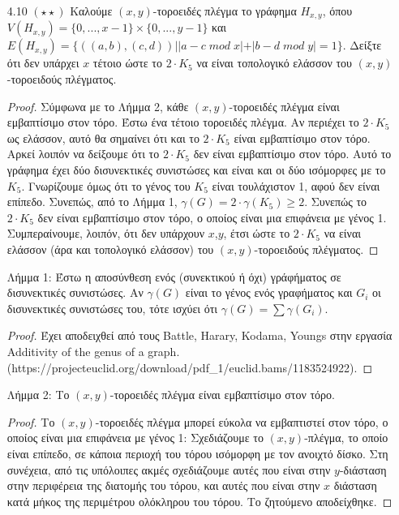 \documentclass[a4paper, oneside, 11pt]{article}
\theoremstyle{definition}
\begin{document}
\begin{enumerate}
\begin{proof}
Συμπεραίνουμε ότι, αφού κάθε άλλη περίπτωση κατέληξε στη μη επιπεδότητα του $G^2$, ότι το $G$ είναι το $K_4$ χωρίς μία ακμή.
	\end{proof}

\item[4.10 $(\star \star)$]
Καλούμε $(x,y)$-τοροειδές πλέγμα το γράφημα $H_{x,y}$, όπου $V(H_{x,y})=\{0,...,x-1\}\times \{0,...,y-1\}$ και $E(H_{x,y})=\{((a,b),(c,d)) | |a-c\;mod\;x| + |b-d\;mod\;y|=1 \}$. Δείξτε ότι δεν υπάρχει $x$
τέτοιο ώστε το $2\cdot K_5$ να είναι τοπολογικό ελάσσον του $(x,y)$-τοροειδούς πλέγματος.

\begin{proof}
Σύμφωνα με το Λήμμα 2, κάθε $(x,y)$-τοροειδές πλέγμα είναι εμβαπτίσιμο στον τόρο. Έστω ένα τέτοιο τοροειδές πλέγμα.
Αν περιέχει το $2\cdot K_5$ ως ελάσσον, αυτό θα σημαίνει ότι και το $2\cdot K_5$ είναι εμβαπτίσιμο στον τόρο. Αρκεί λοιπόν
να δείξουμε ότι το $2\cdot K_5$ δεν είναι εμβαπτίσιμο στον τόρο. 
Αυτό το γράφημα έχει δύο δισυνεκτικές συνιστώσες και είναι και
οι δύο ισόμορφες με το $K_5$. Γνωρίζουμε όμως ότι το γένος του $K_5$ είναι τουλάχιστον 1, αφού δεν είναι επίπεδο. Συνεπώς, από το Λήμμα 1, $\gamma (G)=2\cdot \gamma(K_5)\geq 2$. Συνεπώς το $2\cdot K_5$
δεν είναι εμβαπτίσιμο στον τόρο, ο οποίος είναι μια επιφάνεια με γένος 1. Συμπεραίνουμε, λοιπόν, ότι δεν υπάρχουν $x$,$y$, έτσι ώστε το $2\cdot K_5$ να είναι ελάσσον (άρα και τοπολογικό ελάσσον) του 
$(x,y)$-τοροειδούς πλέγματος.
\end{proof}

Λήμμα 1: Έστω η αποσύνθεση ενός (συνεκτικού ή όχι) γράφήματος σε δισυνεκτικές συνιστώσες. Αν $\gamma(G)$ είναι το γένος ενός γραφήματος και $G_i$ οι δισυνεκτικές συνιστώσες του, τότε ισχύει ότι
$\gamma(G) = \sum {\gamma(G_i)}$.

\begin{proof}
Έχει αποδειχθεί από τους Battle, Harary, Kodama, Youngs στην εργασία Additivity of the genus of a graph.
\newline (https://projecteuclid.org/download/pdf\_1/euclid.bams/1183524922).
\end{proof}

Λήμμα 2: Το $(x,y)$-τοροειδές πλέγμα είναι εμβαπτίσιμο στον τόρο.
\begin{proof}
Το $(x,y)$-τοροειδές πλέγμα μπορεί εύκολα να εμβαπτιστεί
στον τόρο, ο οποίος είναι μια επιφάνεια με γένος 1: Σχεδιάζουμε το $(x,y)$-πλέγμα, το οποίο είναι επίπεδο, σε κάποια περιοχή του τόρου ισόμορφη με τον ανοιχτό δίσκο. 
Στη συνέχεια, από τις υπόλοιπες ακμές σχεδιάζουμε αυτές που είναι 
στην $y$-διάσταση στην περιφέρεια της διατομής του τόρου, και αυτές που είναι στην $x$ διάσταση κατά μήκος της περιμέτρου ολόκληρου του τόρου.
Το ζητούμενο αποδείχθηκε.
\end{proof}

\end{enumerate}
\end{document}
